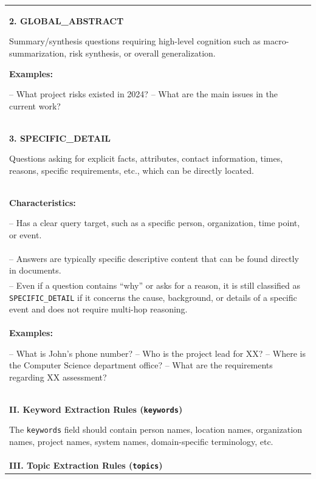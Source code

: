 {\begin{longtable}{@{}p{}@{}}
\textbf{2. GLOBAL\_ABSTRACT}\par

Summary/synthesis questions requiring high-level cognition such as macro-summarization, risk synthesis, or overall generalization.\par

\textbf{Examples:}\par
-- What project risks existed in 2024?\newline
-- What are the main issues in the current work?
\\

\textbf{3. SPECIFIC\_DETAIL}\par
Questions asking for explicit facts, attributes, contact information, times, reasons,
specific requirements, etc., which can be directly located.
\\

\textbf{Characteristics:}\par
-- Has a clear query target, such as a specific person, organization, time point, or event.
\\

-- Answers are typically specific descriptive content that can be found directly in documents.
\\

-- Even if a question contains ``why'' or asks for a reason, it is still classified as
\texttt{SPECIFIC\_DETAIL} if it concerns the cause, background, or details of a specific event
and does not require multi-hop reasoning.
\\

\textbf{Examples:}\par
-- What is John's phone number?\newline
-- Who is the project lead for XX?\newline
-- Where is the Computer Science department office?\newline
-- What are the requirements regarding XX assessment?
\\

\textbf{II. Keyword Extraction Rules (\texttt{keywords})}\par

The \texttt{keywords} field should contain person names, location names, organization names, project names, system names, domain-specific terminology, etc.
\\


\textbf{III. Topic Extraction Rules (\texttt{topics})}\par


\end{longtable}}
